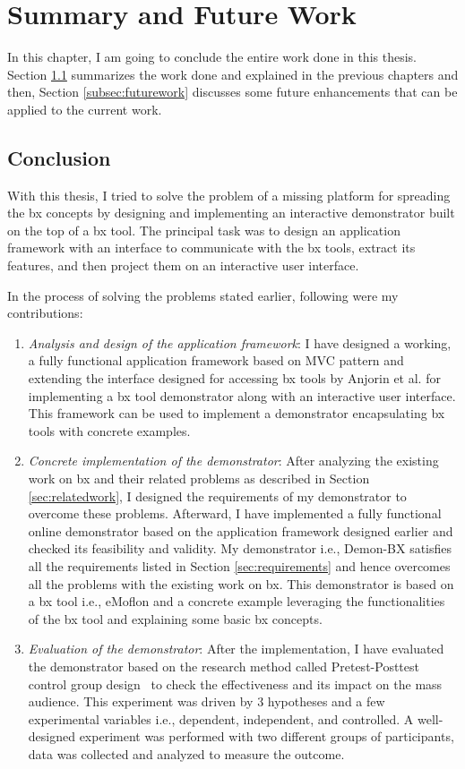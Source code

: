 \section{Summary and Future Work}\label{sec:summary}
In this chapter, I am going to conclude the entire work done in this thesis. Section \ref{subsec:conclusion} summarizes the work done and explained in the previous chapters and then, Section \ref{subsec:futurework} discusses some future enhancements that can be applied to the current work.

\subsection{Conclusion}\label{subsec:conclusion}
With this thesis, I tried to solve the problem of a missing platform for spreading the bx concepts by designing and implementing an interactive demonstrator built on the top of a bx tool. The principal task was to design an application framework with an interface to communicate with the bx tools, extract its features, and then project them on an interactive user interface.

In the process of solving the problems stated earlier, following were my contributions:
\begin{enumerate}
	\item {\textit{Analysis and design of the application framework}: I have designed a working, a fully functional application framework based on MVC pattern and extending the interface designed for accessing bx tools by Anjorin et al. \cite{benchmarx-reload} for implementing a bx tool demonstrator along with an interactive user interface. This framework can be used to implement a demonstrator encapsulating bx tools with concrete examples.}
    \item {\textit{Concrete implementation of the demonstrator}: After analyzing the existing work on bx and their related problems as described in Section \ref{sec:relatedwork}, I designed the requirements of my demonstrator to overcome these problems. Afterward, I have implemented a fully functional online demonstrator based on the application framework designed earlier and checked its feasibility and validity. My demonstrator i.e., Demon-BX satisfies all the requirements listed in Section \ref{sec:requirements} and hence overcomes all the problems with the existing work on bx. This demonstrator is based on a bx tool i.e., eMoflon and a concrete example leveraging the functionalities of the bx tool and explaining some basic bx concepts.}
    \item {\textit{Evaluation of the demonstrator}: After the implementation, I have evaluated the demonstrator based on the research method called Pretest-Posttest control group design~\cite{expandquasiexpdesign} to check the effectiveness and its impact on the mass audience. This experiment was driven by 3 hypotheses and a few experimental variables i.e., dependent, independent, and controlled. A well-designed experiment was performed with two different groups of participants, data was collected and analyzed to measure the outcome.}
	
\end{enumerate}

